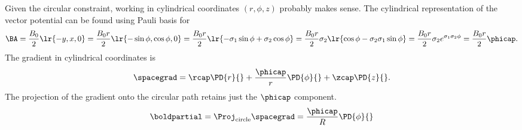 %
%
Given the circular constraint, working in cylindrical coordinates \( ( r, \phi, z ) \) probably makes sense.  The cylindrical representation of the vector potential can be found using Pauli basis for 
%
\begin{dmath}\label{eqn:gradQuantumProblemSet3Problem2:40}
\BA
= \frac{B_0}{2} \lr{ -y, x, 0 }
= \frac{B_0 r}{2} \lr{ -\sin\phi, \cos\phi, 0 }
= \frac{B_0 r}{2} \lr{ - \sigma_1 \sin\phi + \sigma_2 \cos\phi }
= \frac{B_0 r}{2} \sigma_2 \lr{ \cos\phi - \sigma_2 \sigma_1 \sin\phi }
= \frac{B_0 r}{2} \sigma_2 e^{ \sigma_1 \sigma_2 \phi}
= \frac{B_0 r}{2} \phicap.
\end{dmath}
%
The gradient in cylindrical coordinates is
%
\begin{dmath}\label{eqn:gradQuantumProblemSet3Problem2:60}
\spacegrad = \rcap \PD{r}{} + \frac{\phicap}{r} \PD{\phi}{} + \zcap \PD{z}{}.
\end{dmath}
%
The projection of the gradient onto the circular path retains just the \( \phicap \) component.
%
\begin{dmath}\label{eqn:gradQuantumProblemSet3Problem2:120}
\boldpartial = \Proj_{\textrm{circle}} \spacegrad = \frac{\phicap}{R} \PD{\phi}{}
\end{dmath}

